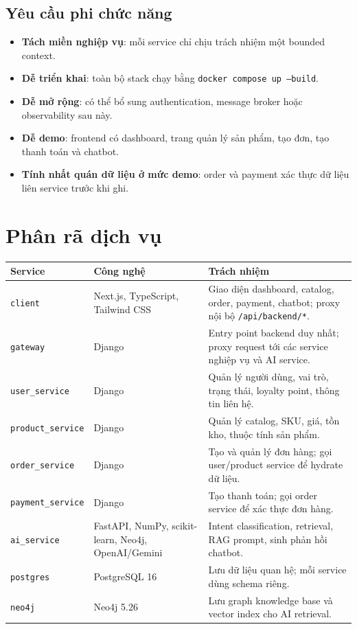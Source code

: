 \documentclass[12pt,a4paper]{report}
\begin{document}
\subsection{Yêu cầu phi chức năng}
\begin{itemize}
  \item \textbf{Tách miền nghiệp vụ}: mỗi service chỉ chịu trách nhiệm một bounded context.
  \item \textbf{Dễ triển khai}: toàn bộ stack chạy bằng \texttt{docker compose up --build}.
  \item \textbf{Dễ mở rộng}: có thể bổ sung authentication, message broker hoặc observability sau này.
  \item \textbf{Dễ demo}: frontend có dashboard, trang quản lý sản phẩm, tạo đơn, tạo thanh toán và chatbot.
  \item \textbf{Tính nhất quán dữ liệu ở mức demo}: order và payment xác thực dữ liệu liên service trước khi ghi.
\end{itemize}

\section{Phân rã dịch vụ}
\begin{longtable}{p{3.2cm}p{4.2cm}p{6.2cm}}
\toprule
\textbf{Service} & \textbf{Công nghệ} & \textbf{Trách nhiệm} \\
\midrule
\texttt{client} & Next.js, TypeScript, Tailwind CSS & Giao diện dashboard, catalog, order, payment, chatbot; proxy nội bộ \texttt{/api/backend/*}. \\
\texttt{gateway} & Django & Entry point backend duy nhất; proxy request tới các service nghiệp vụ và AI service. \\
\texttt{user\_service} & Django & Quản lý người dùng, vai trò, trạng thái, loyalty point, thông tin liên hệ. \\
\texttt{product\_service} & Django & Quản lý catalog, SKU, giá, tồn kho, thuộc tính sản phẩm. \\
\texttt{order\_service} & Django & Tạo và quản lý đơn hàng; gọi user/product service để hydrate dữ liệu. \\
\texttt{payment\_service} & Django & Tạo thanh toán; gọi order service để xác thực đơn hàng. \\
\texttt{ai\_service} & FastAPI, NumPy, scikit-learn, Neo4j, OpenAI/Gemini & Intent classification, retrieval, RAG prompt, sinh phản hồi chatbot. \\
\texttt{postgres} & PostgreSQL 16 & Lưu dữ liệu quan hệ; mỗi service dùng schema riêng. \\
\texttt{neo4j} & Neo4j 5.26 & Lưu graph knowledge base và vector index cho AI retrieval. \\
\bottomrule
\end{longtable}
\end{document}
